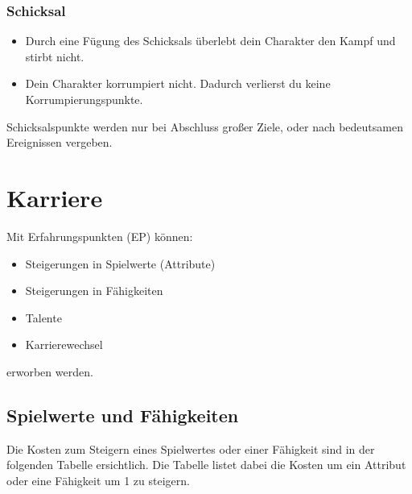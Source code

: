 \documentclass[a4paper,10pt,twoside,twocolumn,openany,bg=none]{dndbook}
\begin{document}
\subsubsection{Schicksal}
\begin{itemize}
  \item Durch eine Fügung des Schicksals überlebt dein Charakter den Kampf und stirbt nicht.
  \item Dein Charakter korrumpiert nicht. Dadurch verlierst du keine Korrumpierungspunkte.
\end{itemize}
Schicksalspunkte werden nur bei Abschluss großer Ziele, oder nach bedeutsamen Ereignissen vergeben.


\vspace{\fill}
\pagebreak

\section{Karriere}
Mit Erfahrungspunkten (EP) können:
\begin{itemize}
  \item Steigerungen in Spielwerte (Attribute)
  \item Steigerungen in Fähigkeiten
  \item Talente
  \item Karrierewechsel
\end{itemize}
erworben werden.

\subsection[short]{Spielwerte und Fähigkeiten}

Die Kosten zum Steigern eines Spielwertes oder einer Fähigkeit sind in der folgenden Tabelle ersichtlich. Die Tabelle listet dabei die Kosten um ein Attribut oder eine Fähigkeit um 1 zu steigern.
\end{document}
